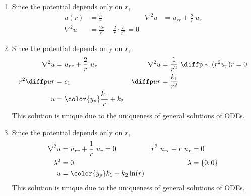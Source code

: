 \begin{enumerate}
    \item Since the potential depends only on $ r $,
          \begin{align}
              u(r)       & = \frac{c}{r}                                          &
              \nabla^2 u & = u_{rr} + \frac{2}{r}\ u_r                              \\
              \nabla^2 u & = \frac{2c}{r^3} - \frac{2}{r} \cdot \frac{c}{r^2} = 0
          \end{align}

    \item Since the potential depends only on $ r $,
          \begin{align}
              \nabla^2 u    & = u_{rr} + \frac{2}{r}\ u_r                  &
              \nabla^2 u    & = \frac{1}{r^2}\ \diffp*{\ (r^2 u_r)}{r} = 0   \\
              r^2 \diffp ur & = c_1                                        &
              \diffp ur     & = \frac{k_1}{r^2}                              \\
              u             & = \color{y_p}\frac{k_1}{r} + k_2
          \end{align}
          This solution is unique due to the uniqueness of general solutions of ODEs.

    \item Since the potential depends only on $ r $,
          \begin{align}
              \nabla^2 u           & = u_{rr} + \frac{1}{r}\ u_r = 0 &
              r^2\ u_{rr} + r\ u_r & = 0                               \\
              \lambda^2            & = 0                             &
              \lambda              & = \{0, 0\}                        \\
              u                    & = \color{y_p}k_1 + k_2\ln(r)
          \end{align}
          This solution is unique due to the uniqueness of general solutions of ODEs.


\end{enumerate}
